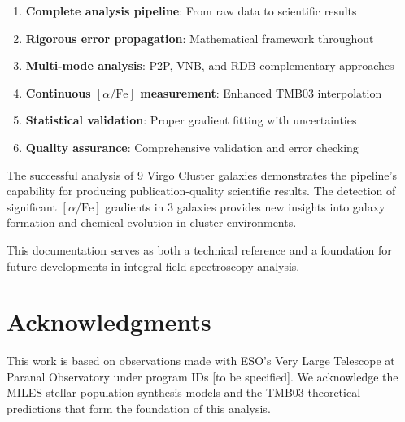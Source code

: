 \documentclass[12pt,a4paper]{article}
\newcommand{\alphaFe}{[\alpha/\text{Fe}]}
\begin{document}
\begin{enumerate}
    \item \textbf{Complete analysis pipeline}: From raw data to scientific results
    \item \textbf{Rigorous error propagation}: Mathematical framework throughout
    \item \textbf{Multi-mode analysis}: P2P, VNB, and RDB complementary approaches
    \item \textbf{Continuous $\alphaFe$ measurement}: Enhanced TMB03 interpolation
    \item \textbf{Statistical validation}: Proper gradient fitting with uncertainties
    \item \textbf{Quality assurance}: Comprehensive validation and error checking
\end{enumerate}

The successful analysis of 9 Virgo Cluster galaxies demonstrates the pipeline's capability for producing publication-quality scientific results. The detection of significant $\alphaFe$ gradients in 3 galaxies provides new insights into galaxy formation and chemical evolution in cluster environments.

This documentation serves as both a technical reference and a foundation for future developments in integral field spectroscopy analysis.

\section*{Acknowledgments}

This work is based on observations made with ESO's Very Large Telescope at Paranal Observatory under program IDs [to be specified]. We acknowledge the MILES stellar population synthesis models and the TMB03 theoretical predictions that form the foundation of this analysis.



\end{document}
